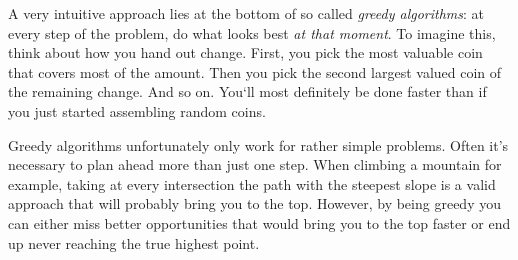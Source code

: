 A very intuitive approach lies at the bottom of so called \emph{greedy algorithms}: at every step of the problem, do what looks best \emph{at that moment}. To imagine this, think about how you hand out change. First, you pick the most valuable coin that covers most of the amount. Then you pick the second largest valued coin of the remaining change. And so on. You‘ll most definitely be done faster than if you just started assembling random coins.

Greedy algorithms unfortunately only work for rather simple problems. Often it’s necessary to plan ahead more than just one step. When climbing a mountain for example, taking at every intersection the path with the steepest slope is a valid approach that will probably bring you to the top. However, by being greedy you can either miss better opportunities that would bring you to the top faster or end up never reaching the true highest point.
